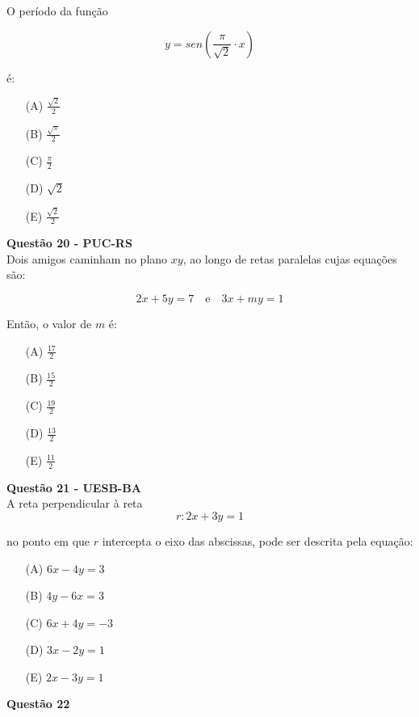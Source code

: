 \documentclass[12pt]{article}
\begin{document}
\begin{multicols}{2}
O período da função

\[
y = sen\left( \frac{\pi}{\sqrt{2}} \cdot x \right)
\]

é:

\begin{itemize}
    \item[(A)] \(\frac{\sqrt{2}}{2}\)
    \item[(B)] \(\frac{\sqrt{\pi}}{2}\)
    \item[(C)] \(\frac{\pi}{2}\)
    \item[(D)] \(\sqrt{2}\)
    \item[(E)] \(\frac{\sqrt{2}}{2}\)
\end{itemize}
\textbf{Questão 20 - PUC-RS} \\

Dois amigos caminham no plano \(xy\), ao longo de retas paralelas cujas equações são:

\[
2x + 5y = 7 \quad \text{e} \quad 3x + my = 1
\]

Então, o valor de \(m\) é:

\begin{itemize}
    \item[(A)] \(\frac{17}{2}\)
    \item[(B)] \(\frac{15}{2}\)
    \item[(C)] \(\frac{19}{2}\)
    \item[(D)] \(\frac{13}{2}\)
    \item[(E)] \(\frac{11}{2}\)
\end{itemize}
\textbf{Questão 21 - UESB-BA} \\

A reta perpendicular à reta 
\[
r: 2x + 3y = 1
\]

no ponto em que \(r\) intercepta o eixo das abscissas, pode ser descrita pela equação:

\begin{itemize}
    \item[(A)] \(6x - 4y = 3\)
    \item[(B)] \(4y - 6x = 3\)
    \item[(C)] \(6x + 4y = -3\)
    \item[(D)] \(3x - 2y = 1\)
    \item[(E)] \(2x - 3y = 1\)
\end{itemize}


\textbf{Questão 22} \\


\end{multicols}
\end{document}
